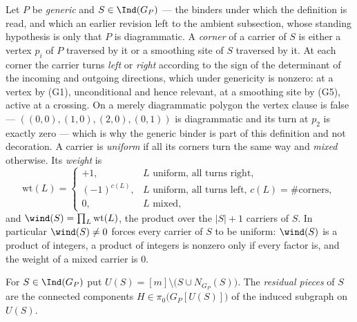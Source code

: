 \begin{definition}\label{CV:def:wind}\leanok
Let $P$ be \emph{generic} and $S\in\Ind(G_P)$ --- the binders under which the
definition is read, and which an earlier revision left to the ambient
subsection, whose standing hypothesis is only that $P$ is diagrammatic. A
\emph{corner} of a carrier of $S$ is either a vertex $p_i$ of $P$ traversed by
it or a smoothing site of $S$ traversed by it. At each corner the carrier turns
\emph{left} or \emph{right} according to the sign of the determinant of the
incoming and outgoing directions, which under genericity is nonzero: at a
vertex by (G1), unconditional and hence relevant, at a smoothing site by (G5),
active at a crossing. On a merely diagrammatic polygon the vertex clause is
false --- $((0,0),(1,0),(2,0),(0,1))$ is diagrammatic and its turn at $p_2$ is
exactly zero --- which is why the generic binder is part of this definition and
not decoration. A carrier is \emph{uniform} if all its corners turn the
same way and \emph{mixed} otherwise. Its \emph{weight} is
\[
   \mathrm{wt}(L)=\begin{cases}
     +1, & L \text{ uniform, all turns right},\\
     (-1)^{c(L)}, & L \text{ uniform, all turns left, } c(L)=\#\text{corners},\\
     0, & L \text{ mixed},
   \end{cases}
\]
and $\wind(S)=\prod_{L}\mathrm{wt}(L)$, the product over the $|S|+1$ carriers of
$S$. In particular $\wind(S)\neq0$ forces every carrier of $S$ to be
uniform: $\wind(S)$ is a product of integers, a product of integers is
nonzero only if every factor is, and the weight of a mixed carrier is $0$.
\end{definition}

\begin{definition}\label{CV:def:pieces}\leanok
For $S\in\Ind(G_P)$ put $U(S)=[m]\setminus\bigl(S\cup N_{G_P}(S)\bigr)$. The
\emph{residual pieces} of $S$ are the connected components
$H\in\pi_0\bigl(G_P[U(S)]\bigr)$ of the induced subgraph on $U(S)$.
\end{definition}

